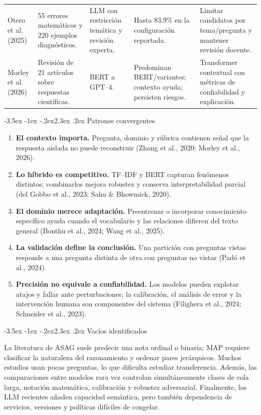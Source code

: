 \documentclass[11pt,oneside,openany]{book}
\makeatletter
\renewcommand\section{\@startsection{section}{1}{\z@}%
  {-3.5ex \@plus -1ex \@minus -.2ex}{2.3ex \@plus .2ex}%
  {\normalfont\Large\sffamily\bfseries\color{AzulMedio}}}
\makeatother
\begin{document}
\begin{longtable}{@{}P{2.55cm}P{2.5cm}P{3.05cm}P{3.15cm}P{3.05cm}@{}}
Otero et al. (2025) & 55 errores matemáticos y 220 ejemplos diagnósticos. & LLM con
restricción temática y revisión experta. & Hasta 83.9\% en la configuración
reportada. & Limitar candidatos por tema/pregunta y mantener revisión docente.\\[2mm]

Morley et al. (2026) & Revisión de 21 artículos sobre respuestas científicas. &
BERT a GPT--4. & Predominan BERT/variantes; contexto ayuda; persisten riesgos. &
Transformer contextual con métricas de confiabilidad y explicación.\\
\end{longtable}
\normalsize

\section{Patrones convergentes}

\begin{enumerate}
  \item \textbf{El contexto importa.} Pregunta, dominio y rúbrica contienen señal
  que la respuesta aislada no puede reconstruir (Zhang et al., 2020;
  Morley et al., 2026).
  \item \textbf{Lo híbrido es competitivo.} TF--IDF y BERT capturan fenómenos
  distintos; combinarlos mejora robustez y conserva interpretabilidad parcial
  (del Gobbo et al., 2023; Sahu \& Bhowmick, 2020).
  \item \textbf{El dominio merece adaptación.} Preentrenar o incorporar conocimiento
  específico ayuda cuando el vocabulario y las relaciones difieren del texto
  general (Bonthu et al., 2024; Wang et al., 2025).
  \item \textbf{La validación define la conclusión.} Una partición con preguntas
  vistas responde a una pregunta distinta de otra con preguntas no vistas (Padó
  et al., 2024).
  \item \textbf{Precisión no equivale a confiabilidad.} Los modelos pueden explotar
  atajos y fallar ante perturbaciones; la calibración, el análisis de error y la
  intervención humana son componentes del sistema (Filighera et al., 2024;
  Schneider et al., 2023).
\end{enumerate}

\section{Vacíos identificados}

La literatura de ASAG suele predecir una nota ordinal o binaria; MAP requiere
clasificar la naturaleza del razonamiento y ordenar pares jerárquicos. Muchos
estudios usan pocas preguntas, lo que dificulta estudiar transferencia. Además,
las comparaciones entre modelos rara vez controlan simultáneamente clases de cola
larga, notación matemática, calibración y robustez adversarial. Finalmente, los
LLM recientes añaden capacidad semántica, pero también dependencia de servicios,
versiones y políticas difíciles de congelar.
\end{document}
